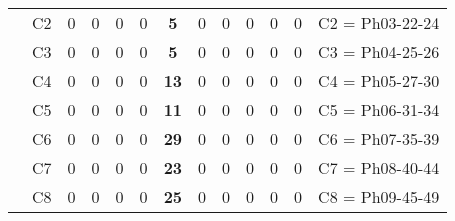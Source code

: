 \begin{table}[H]
{\begin{tabular}{|ccccccccccccc|}
\multicolumn{1}{|c|}{}                                      & \multicolumn{1}{c|}{C2} & \multicolumn{1}{c|}{0}  & \multicolumn{1}{c|}{0}  & \multicolumn{1}{c|}{0}  & \multicolumn{1}{c|}{0}  & \multicolumn{1}{c|}{\textbf{5}}  & \multicolumn{1}{c|}{0}  & \multicolumn{1}{c|}{0}  & \multicolumn{1}{c|}{0}  & \multicolumn{1}{c|}{0}  & \multicolumn{1}{c|}{0}  & C2 = Ph03-22-24   \\ \cline{2-13}
\multicolumn{1}{|c|}{}                                      & \multicolumn{1}{c|}{C3} & \multicolumn{1}{c|}{0}  & \multicolumn{1}{c|}{0}  & \multicolumn{1}{c|}{0}  & \multicolumn{1}{c|}{0}  & \multicolumn{1}{c|}{\textbf{5}}  & \multicolumn{1}{c|}{0}  & \multicolumn{1}{c|}{0}  & \multicolumn{1}{c|}{0}  & \multicolumn{1}{c|}{0}  & \multicolumn{1}{c|}{0}  & C3 = Ph04-25-26   \\ \cline{2-13}
\multicolumn{1}{|c|}{}                                      & \multicolumn{1}{c|}{C4} & \multicolumn{1}{c|}{0}  & \multicolumn{1}{c|}{0}  & \multicolumn{1}{c|}{0}  & \multicolumn{1}{c|}{0}  & \multicolumn{1}{c|}{\textbf{13}}  & \multicolumn{1}{c|}{0}  & \multicolumn{1}{c|}{0}  & \multicolumn{1}{c|}{0}  & \multicolumn{1}{c|}{0}  & \multicolumn{1}{c|}{0} & C4 = Ph05-27-30   \\ \cline{2-13}
\multicolumn{1}{|c|}{}                                      & \multicolumn{1}{c|}{C5} & \multicolumn{1}{c|}{0}  & \multicolumn{1}{c|}{0}  & \multicolumn{1}{c|}{0}  & \multicolumn{1}{c|}{0}  & \multicolumn{1}{c|}{\textbf{11}}  & \multicolumn{1}{c|}{0}  & \multicolumn{1}{c|}{0}  & \multicolumn{1}{c|}{0}  & \multicolumn{1}{c|}{0}  & \multicolumn{1}{c|}{0} & C5 = Ph06-31-34   \\ \cline{2-13}
\multicolumn{1}{|c|}{}                                      & \multicolumn{1}{c|}{C6} & \multicolumn{1}{c|}{0}  & \multicolumn{1}{c|}{0}  & \multicolumn{1}{c|}{0}  & \multicolumn{1}{c|}{0}  & \multicolumn{1}{c|}{\textbf{29}}  & \multicolumn{1}{c|}{0}  & \multicolumn{1}{c|}{0}  & \multicolumn{1}{c|}{0}  & \multicolumn{1}{c|}{0}  & \multicolumn{1}{c|}{0} & C6 = Ph07-35-39   \\ \cline{2-13}
\multicolumn{1}{|c|}{}                                      & \multicolumn{1}{c|}{C7} & \multicolumn{1}{c|}{0}  & \multicolumn{1}{c|}{0}  & \multicolumn{1}{c|}{0}  & \multicolumn{1}{c|}{0}  & \multicolumn{1}{c|}{\textbf{23}}  & \multicolumn{1}{c|}{0}  & \multicolumn{1}{c|}{0}  & \multicolumn{1}{c|}{0}  & \multicolumn{1}{c|}{0}  & \multicolumn{1}{c|}{0} & C7 = Ph08-40-44   \\ \cline{2-13}
\multicolumn{1}{|c|}{}                                      & \multicolumn{1}{c|}{C8} & \multicolumn{1}{c|}{0}  & \multicolumn{1}{c|}{0}  & \multicolumn{1}{c|}{0}  & \multicolumn{1}{c|}{0}  & \multicolumn{1}{c|}{\textbf{25}}  & \multicolumn{1}{c|}{0}  & \multicolumn{1}{c|}{0}  & \multicolumn{1}{c|}{0}  & \multicolumn{1}{c|}{0}  & \multicolumn{1}{c|}{0} & C8 = Ph09-45-49   \\ \cline{2-13}

\end{tabular}}
\end{table}
